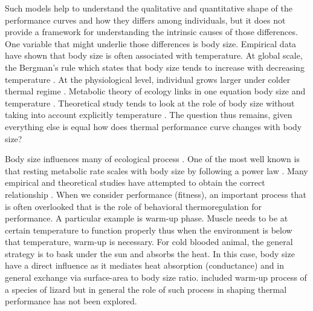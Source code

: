Such models help to understand the qualitative and quantitative shape of the performance curves and how they differs  among individuals, but it does not provide a framework for understanding the intrinsic causes of those differences.
One variable that might underlie those differences is body size.
Empirical data have shown that body size is often associated with temperature.  
At global scale, the Bergman's rule which states that body size tends to increase with decreasing temperature \citep{Bergman1847}.
At the physiological level, individual grows larger under colder thermal regime \citep{Van1996}.
Metabolic theory of ecology links in one equation body size and temperature \citep{Brown2004}.
Theoretical study tends to look at the role of body size without taking into account explicitly temperature \citep[e.g.,]{Yodzis1992, Brown1993}.
The question thus remains, given everything else is equal how does thermal performance curve changes with body size?

Body size influences many of ecological process \citep{Peters1986}.
One of the most well known is that resting metabolic rate scales with body size by following a power law \citep{Kleiber1947, Peters1986, Brown2004}.
Many empirical and theoretical studies have attempted to obtain the correct relationship \citep{West1997, Kozlowski1997, Isaac2010}.
When we consider performance (fitness), an important process that is often overlooked that is the role of behavioral thermoregulation for performance. 
A particular example is warm-up phase. 
Muscle needs to be at certain temperature to function properly thus when the environment is below that temperature, warm-up is necessary. 
For cold blooded animal, the general strategy is to bask under the sun and absorbs the heat.
In this case, body size have a direct influence as it mediates heat absorption (conductance) and in general exchange via surface-area to body size ratio.
\citet{Buckley2008} included warm-up process of a species of lizard but in general the role of such process in shaping thermal performance has not been explored. 

